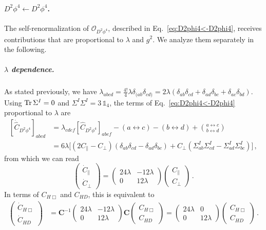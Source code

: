 \paragraph{\texorpdfstring{$D^2\phi^4 \leftarrow D^2\phi^4$}{D2phi4fromD2phi4}.}
The self-renormalization of $\mathcal O_{D^2\phi^4}$, described in Eq.~\eqref{eq:D2phi4<-D2phi4}, receives contributions that are proportional to $\lambda$ and $g^2$.
We analyze them separately in the following.

\subparagraph{$\lambda$ dependence.}
As stated previously, we have $\lambda_{abcd}=\frac{4!}{4}\lambda \delta_{(ab}\delta_{cd)}= 2\lambda (\delta_{ab}\delta_{cd}+\delta_{ad}\delta_{bc}+\delta_{ac}\delta_{bd})$.
Using $\Tr \Sigma^I =0$ and $\Sigma^I \Sigma^I = 3\, \mathbb{1}_4$, the terms of Eq.~\eqref{eq:D2phi4<-D2phi4} proportional to $\lambda$ are
\begin{align}
    \left[\dot{\widehat C}_{D^2\phi^4}\right]_{abcd} 
    &=\lambda_{cdef}
    \left[\widehat C_{D^2\phi^4}\right]_{abef}
    - (a\leftrightarrow c) - (b\leftrightarrow d) + 
    \binom{a\leftrightarrow c}{b\leftrightarrow d}\nonumber \\
    &= 6\lambda \Big[
    \left(2C_\parallel -  C_\perp\right) \left(\delta_{ab}\delta_{cd}-\delta_{ad}\delta_{bc}\right)
    + C_\perp \left(\Sigma^I_{ab}\Sigma^I_{cd}-\Sigma^I_{ad}\Sigma^I_{bc}\right)
    \Big]\,,
\end{align}
from which we can read
\begin{equation}
     \begin{pmatrix}
    \dot C_\parallel \\ \dot C_\perp
\end{pmatrix}
=
 \begin{pmatrix}
    24\lambda & -12\lambda \\
    0 & 12\lambda
\end{pmatrix}
 \begin{pmatrix}
    C_\parallel \\ C_\perp
\end{pmatrix}\,.
\end{equation}
In terms of $C_{H\Box}$ and $C_{HD}$, this is equivalent to
\begin{align}
    \begin{pmatrix}
    \dot C_{H\Box} \\ \dot C_{HD}
\end{pmatrix}
    &= \mathbf{C}^{-1}
    \begin{pmatrix}
    24\lambda & -12\lambda \\
    0 & 12\lambda
\end{pmatrix}
    \mathbf{C}
    \begin{pmatrix}
     C_{H\Box} \\  C_{HD}
    \end{pmatrix}
    = 
    \begin{pmatrix}
    24\lambda & 0\\
    0 & 12\lambda
    \end{pmatrix}
    \begin{pmatrix}
     C_{H\Box} \\  C_{HD}
    \end{pmatrix}\,.\label{eq:dotCHBoxandCHDlambda}
\end{align}


